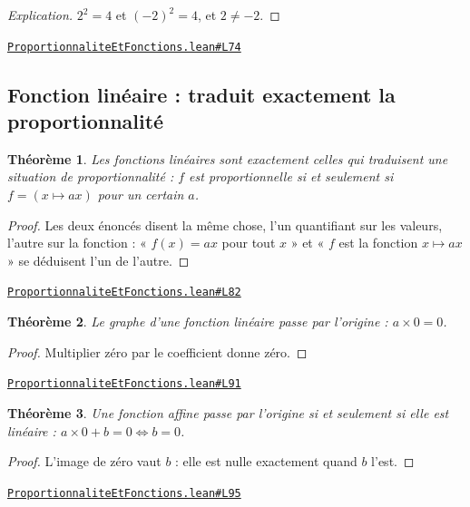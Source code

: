 \documentclass[11pt,a4paper]{article}
\theoremstyle{definition}
\theoremstyle{plain}
\newtheorem{theoreme}{Théorème}
\newenvironment{explication}{\begin{proof}[Explication]}{\end{proof}}
\newcommand{\source}[2]{\par\smallskip\noindent\hfill{\footnotesize\href{#1}{\texttt{#2}}}\par\smallskip}
\begin{document}
\begin{explication}
$2^2 = 4$ et $(-2)^2 = 4$, et $2 \ne -2$.
\end{explication}
\source{https://github.com/Commutator-IO/learn-lean/blob/main/courses/01-college/05-proportionnalite-et-fonctions/ProportionnaliteEtFonctions.lean\#L74}{ProportionnaliteEtFonctions.lean\#L74}

\subsection{Fonction linéaire : traduit exactement la proportionnalité}

\begin{theoreme}
Les fonctions linéaires sont exactement celles qui traduisent une situation de
proportionnalité : $f$ est proportionnelle si et seulement si $f = (x \mapsto ax)$ pour un
certain $a$.
\end{theoreme}

\begin{proof}
Les deux énoncés disent la même chose, l'un quantifiant sur les valeurs, l'autre sur la
fonction : « $f(x) = ax$ pour tout $x$ » et « $f$ est la fonction $x \mapsto ax$ » se
déduisent l'un de l'autre.
\end{proof}
\source{https://github.com/Commutator-IO/learn-lean/blob/main/courses/01-college/05-proportionnalite-et-fonctions/ProportionnaliteEtFonctions.lean\#L82}{ProportionnaliteEtFonctions.lean\#L82}

\begin{theoreme}
Le graphe d'une fonction linéaire passe par l'origine : $a \times 0 = 0$.
\end{theoreme}

\begin{proof}
Multiplier zéro par le coefficient donne zéro.
\end{proof}
\source{https://github.com/Commutator-IO/learn-lean/blob/main/courses/01-college/05-proportionnalite-et-fonctions/ProportionnaliteEtFonctions.lean\#L91}{ProportionnaliteEtFonctions.lean\#L91}

\begin{theoreme}
Une fonction affine passe par l'origine si et seulement si elle est linéaire :
$a \times 0 + b = 0 \iff b = 0$.
\end{theoreme}

\begin{proof}
L'image de zéro vaut $b$ : elle est nulle exactement quand $b$ l'est.
\end{proof}
\source{https://github.com/Commutator-IO/learn-lean/blob/main/courses/01-college/05-proportionnalite-et-fonctions/ProportionnaliteEtFonctions.lean\#L95}{ProportionnaliteEtFonctions.lean\#L95}
\end{document}
